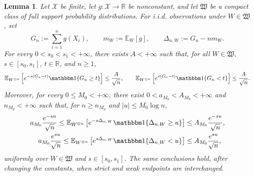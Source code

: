 \documentclass[journal,10pt,draftclsnofoot,onecolumn]{IEEEtran}
\newtheorem{lemma}{Lemma}
\begin{document}
\begin{lemma}
\label{lem:weighted-tail-bounds}
Let $\mathcal X$ be finite, let $g:\mathcal X\to\mathbb R$ be nonconstant, and let $\mathfrak W$ be a compact class of full support probability distributions. For i.i.d. observations under $W\in\mathfrak W$, set
\begin{equation*}
G_n:=\sum_{i=1}^n g(X_i), \qquad m_W:=\mathbb E_W[g], \qquad \Delta_{n,W} :=G_n-nm_W.
\end{equation*}
For every $0<s_0<s_1<+\infty$, there exists $A<+\infty$ such that, for all $W\in\mathfrak W$, $s\in[s_0,s_1]$, $t\in\mathbb R$, and $n\geq1$,
\begin{align*}
\mathbb E_{W^{\otimes n}} \left[e^{-s(G_n-t)} \mathbbm 1\{G_n\geq t\}\right] \leq
\frac{A}{\sqrt n}, \qquad \mathbb E_{W^{\otimes n}}\left[e^{s(G_n-t)}
\mathbbm 1\{G_n<t\}\right] \leq \frac{A}{\sqrt n}.
\end{align*}
Moreover, for every $0\leq M_0<+\infty$, there exist $0<a_{M_0}<A_{M_0}<+\infty$ and $n_{M_0}<+\infty$ such that, for $n\geq n_{M_0}$ and $|u|\leq M_0\log n$,
\begin{align*}
a_{M_0}\frac{e^{-su}}{\sqrt n} \leq \mathbb E_{W^{\otimes n}} \left[e^{-s\Delta_{n,W}} \mathbbm 1\{\Delta_{n,W}\geq u\} \right]&\leq A_{M_0}\frac{e^{-su}}{\sqrt n},\\a_{M_0}\frac{e^{su}}{\sqrt n}
\leq \mathbb E_{W^{\otimes n}} \left[ e^{s\Delta_{n,W}} \mathbbm 1\{\Delta_{n,W}<u\} \right]&\leq A_{M_0}\frac{e^{su}}{\sqrt n},
\end{align*}
uniformly over $W\in\mathfrak W$ and $s\in[s_0,s_1]$. The same conclusions hold, after changing the constants, when strict and weak endpoints are interchanged.
\end{lemma}
\end{document}
